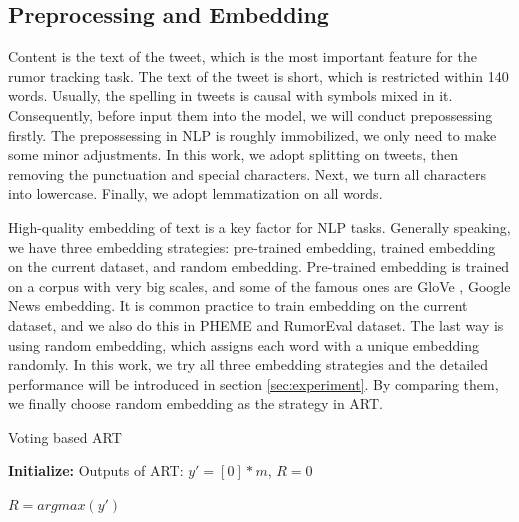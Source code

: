 \subsection{Preprocessing and Embedding}
\label{sec:process_embedding}
Content is the text of the tweet, which is the most important feature for the rumor tracking task. The text of the tweet is short, which is restricted within 140 words. Usually, the spelling in tweets is causal with symbols mixed in it. Consequently, before input them into the model, we will conduct prepossessing firstly. The prepossessing in NLP is roughly immobilized, we only need to make some minor adjustments. In this work, we adopt splitting on tweets, then removing the punctuation and special characters. Next, we turn all characters into lowercase. Finally, we adopt lemmatization on all words.

High-quality embedding of text is a key factor for NLP tasks. Generally speaking, we have three embedding strategies: pre-trained embedding, trained embedding on the current dataset, and random embedding. Pre-trained embedding is trained on a corpus with very big scales, and some of the famous ones are GloVe \cite{DBLP:conf/emnlp/PenningtonSM14}, Google News embedding\cite{DBLP:journals/corr/abs-1301-3781}. It is common practice to train embedding on the current dataset, and we also do this in PHEME and RumorEval dataset. The last way is using random embedding, which assigns each word with a unique embedding randomly. In this work, we try all three embedding strategies and the detailed performance will be introduced in section \ref{sec:experiment}. By comparing them, we finally choose random embedding as the strategy in ART.

\begin{algorithm}[tbp]
	\caption{Voting based ART}
	\label{algorithm:art}
	\LinesNumbered %
	\textbf{Initialize:} Outputs of ART: $y' = [0]*m$, $R = 0$ \;
	
	
	$R = argmax(y')$
\end{algorithm}

